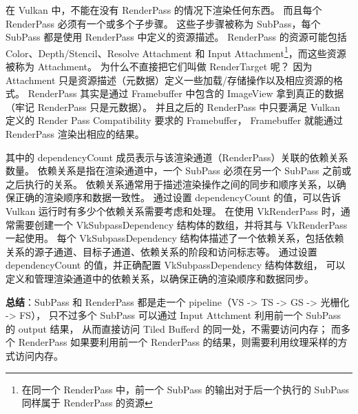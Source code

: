 \documentclass[a4paper, 12pt]{ctexart}
\begin{document}
    在 Vulkan 中，不能在没有 RenderPass 的情况下渲染任何东西。
    而且每个 RenderPass 必须有一个或多个子步骤。
    这些子步骤被称为 SubPass，每个 SubPass 都是使用 RenderPass 中定义的资源描述。
    RenderPass 的资源可能包括 Color、Depth/Stencil、Resolve Attachment 和 Input Attachment\footnote{
        在同一个 RenderPass 中，前一个 SubPass 的输出对于后一个执行的 SubPass 同样属于 RenderPass 的资源
    }，而这些资源被称为 Attachment。
    为什么不直接把它们叫做 RenderTarget 呢？
    因为 Attachment 只是资源描述（元数据）定义一些加载/存储操作以及相应资源的格式。
    RenderPass 其实是通过 Framebuffer 中包含的 ImageView 拿到真正的数据（牢记 RenderPass 只是元数据）。
    并且之后的 RenderPass 中只要满足 Vulkan 定义的 Render Pass Compatibility 要求的 Framebuffer，
    Framebuffer 就能通过 RenderPass 渲染出相应的结果。

    其中的 dependencyCount 成员表示与该渲染通道（RenderPass）关联的依赖关系数量。
    依赖关系是指在渲染通道中，一个 SubPass 必须在另一个 SubPass 之前或之后执行的关系。
    依赖关系通常用于描述渲染操作之间的同步和顺序关系，以确保正确的渲染顺序和数据一致性。
    通过设置 dependencyCount 的值，可以告诉 Vulkan 运行时有多少个依赖关系需要考虑和处理。
    在使用 VkRenderPass 时，通常需要创建一个 VkSubpassDependency 结构体的数组，并将其与 VkRenderPass 一起使用。
    每个 VkSubpassDependency 结构体描述了一个依赖关系，包括依赖关系的源子通道、目标子通道、依赖关系的阶段和访问标志等。
    通过设置 dependencyCount 的值，并正确配置 VkSubpassDependency 结构体数组，
    可以定义和管理渲染通道中的依赖关系，以确保正确的渲染顺序和数据同步。

    \textbf{总结}：SubPass 和 RenderPass 都是走一个 pipeline（VS -> TS -> GS -> 光栅化 -> FS），
    只不过多个 SubPass 可以通过 Input Attchment 利用前一个 SubPass 的 output 结果，
    从而直接访问 Tiled Bufferd 的同一处，不需要访问内存；
    而多个 RenderPass 如果要利用前一个 RenderPass 的结果，则需要利用纹理采样的方式访问内存。

    
\clearpage
\end{document}
